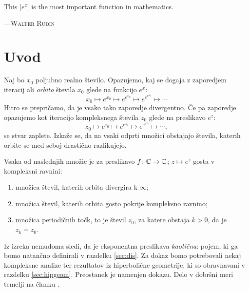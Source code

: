 \let\origthefootnote\thefootnote
\renewcommand{\thefootnote}{\fnsymbol{footnote}}

\epigraph{
    This \textup{[\(e^z\)]} is the most important function in mathematics.
    }{
        \textsc{---Walter Rudin}\footnotemark
    }
        

\let\thefootnote\origthefootnote

\section{Uvod} \label{sec:intro}

Naj bo \(x_0\) poljubno realno število. Opazujemo, kaj se dogaja z zaporedjem iteracij ali \emph{orbito} števila \(x_0\) glede na funkcijo \(e^{x}\):
\[x_0 \mapsto e^{x_0} \mapsto e^{e^{x_0}} \mapsto e^{e^{e^{x_0}}} \mapsto \cdots\]
Hitro se prepričamo, da je vsako tako zaporedje divergentno. Če pa zaporedje opazujemo kot iteracijo kompleksnega števila \(z_0\) glede na preslikavo \(e^z\):
\[z_0 \mapsto e^{z_0} \mapsto e^{e^{z_0}} \mapsto e^{e^{e^{z_0}}} \mapsto \cdots,\]
se stvar zaplete. Izkaže se, da na vsaki odprti množici obstajajo števila, katerih orbite se med seboj drastično razlikujejo.

\begin{izrek} \label{thm:orbits}
    Vsaka od naslednjih množic je za preslikavo \(f \colon \mathbb C \to \mathbb C\); \(z \mapsto e^{z}\) gosta v kompleksni ravnini:
    \begin{enumerate}
        \item množica števil, katerih orbita divergira k \(\infty\);
        \item množica števil, katerih orbita gosto pokrije kompleksno ravnino;
        \item množica periodičnih točk, to je števil \(z_0\), za katere obstaja \(k > 0\), da je \(z_k = z_0\).
    \end{enumerate}
\end{izrek}

\noindent Iz izreka nemudoma sledi, da je eksponentna preslikava \emph{kaotična}: pojem, ki ga bomo natančno definirali v razdelku \ref{sec:dis}. Za dokaz bomo potrebovali nekaj kompleksne analize ter rezultatov iz hiperbolične geometrije, ki so obravnavani v razdelku \ref{sec:hipgeom}. Preostanek je namenjen dokazu. Delo v dobršni meri temelji na članku \cite{Shen_2015}.
